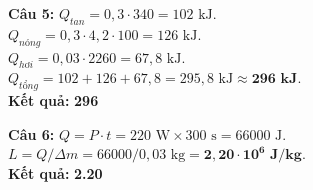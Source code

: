 \documentclass[12pt,a4paper]{article}
\begin{document}
\textbf{Câu 5:} $Q_{tan} = 0{,}3 \cdot 340 = 102\text{ kJ}$.\\
          $Q_{nóng} = 0{,}3 \cdot 4{,}2 \cdot 100 = 126\text{ kJ}$.\\
          $Q_{hơi} = 0{,}03 \cdot 2260 = 67{,}8\text{ kJ}$.\\
          $Q_{tổng} = 102 + 126 + 67{,}8 = 295{,}8\text{ kJ} \approx \mathbf{296\text{ kJ}}$.\\
\textbf{Kết quả:} \textbf{296}

\textbf{Câu 6:} $Q = P \cdot t = 220\text{ W} \times 300\text{ s} = 66000\text{ J}$.\\
          $L = Q / \Delta m = 66000 / 0{,}03\text{ kg} = \mathbf{2{,}20 \cdot 10^6\text{ J/kg}}$.\\
\textbf{Kết quả:} \textbf{2.20}
\end{document}

